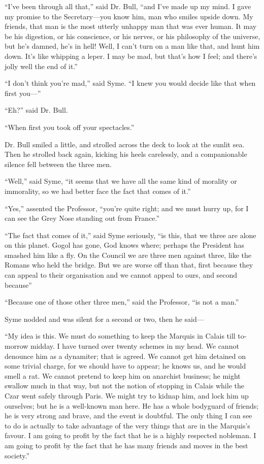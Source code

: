 \documentclass{book}
\begin{document}
“I’ve been through all that,” said Dr. Bull, “and I’ve made up my mind. I gave my promise to the Secretary—you know him, man who smiles upside down. My friends, that man is the most utterly unhappy man that was ever human. It may be his digestion, or his conscience, or his nerves, or his philosophy of the universe, but he’s damned, he’s in hell! Well, I can’t turn on a man like that, and hunt him down. It’s like whipping a leper. I may be mad, but that’s how I feel; and there’s jolly well the end of it.”

“I don’t think you’re mad,” said Syme. “I knew you would decide like that when first you—”

“Eh?” said Dr. Bull.

“When first you took off your spectacles.”

Dr. Bull smiled a little, and strolled across the deck to look at the sunlit sea. Then he strolled back again, kicking his heels carelessly, and a companionable silence fell between the three men.

“Well,” said Syme, “it seems that we have all the same kind of morality or immorality, so we had better face the fact that comes of it.”

“Yes,” assented the Professor, “you’re quite right; and we must hurry up, for I can see the Grey Nose standing out from France.”

“The fact that comes of it,” said Syme seriously, “is this, that we three are alone on this planet. Gogol has gone, God knows where; perhaps the President has smashed him like a fly. On the Council we are three men against three, like the Romans who held the bridge. But we are worse off than that, first because they can appeal to their organisation and we cannot appeal to ours, and second because”

“Because one of those other three men,” said the Professor, “is not a man.”

Syme nodded and was silent for a second or two, then he said—

“My idea is this. We must do something to keep the Marquis in Calais till to-morrow midday. I have turned over twenty schemes in my head. We cannot denounce him as a dynamiter; that is agreed. We cannot get him detained on some trivial charge, for we should have to appear; he knows us, and he would smell a rat. We cannot pretend to keep him on anarchist business; he might swallow much in that way, but not the notion of stopping in Calais while the Czar went safely through Paris. We might try to kidnap him, and lock him up ourselves; but he is a well-known man here. He has a whole bodyguard of friends; he is very strong and brave, and the event is doubtful. The only thing I can see to do is actually to take advantage of the very things that are in the Marquis’s favour. I am going to profit by the fact that he is a highly respected nobleman. I am going to profit by the fact that he has many friends and moves in the best society.”
\end{document}
